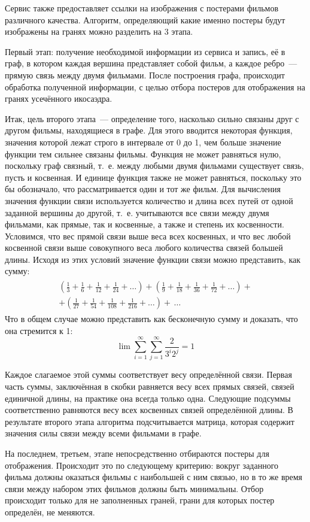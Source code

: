 \documentclass[oneside,final,14pt]{extreport}
\begin{document}
Сервис также предоставляет ссылки на изображения с постерами фильмов различного качества. Алгоритм, определяющий какие именно постеры будут изображены на гранях можно разделить на 3 этапа.

Первый этап: получение необходимой информации из сервиса и запись, её в граф, в котором каждая вершина представляет собой фильм, а каждое ребро~--- прямую связь между двумя фильмами. После построения графа, происходит обработка полученной информации, с целью отбора постеров для отображения на гранях усечённого икосаэдра.

Итак, цель второго этапа~--- определение того, насколько сильно связаны друг с другом фильмы, находящиеся в графе. Для этого вводится некоторая функция, значения которой лежат строго в интервале от 0 до 1, чем больше значение функции тем сильнее связаны фильмы. Функция не может равняться нулю, поскольку граф связный, т.~е. между любыми двумя фильмами существует связь, пусть и косвенная. И единице функция также не может равняться, поскольку это бы обозначало, что рассматривается один и тот же фильм. Для вычисления значения функции связи используется количество и длина всех путей от одной заданной вершины до другой, т.~е. учитываются все связи между двумя фильмами, как прямые, так и косвенные, а также и степень их косвенности. Условимся, что вес прямой связи выше веса всех косвенных, и что вес любой косвенной связи выше совокупного веса любого количества связей большей длины. Исходя из этих условий значение функции связи можно представить, как сумму:
\begin{align} \begin{split}
\left ( \frac{1}{3} + \frac{1}{6} + \frac{1}{12} + \frac{1}{24} + \ldots \right ) +
\left ( \frac{1}{9} + \frac{1}{18} + \frac{1}{36} + \frac{1}{72} + \ldots \right ) + \\ +
\left ( \frac{1}{27} + \frac{1}{54} + \frac{1}{108} + \frac{1}{216} + \ldots \right ) + \,\ldots
\end{split} \end{align}
Что в общем случае можно представить как бесконечную сумму и доказать, что она стремится к 1:
\begin{equation} \lim \sum_{i=1}^{\infty} \sum_{j=1}^{\infty} \frac{2}{ 3^{i} 2^{j} } = 1 \end{equation}

Каждое слагаемое этой суммы соответствует весу определённой связи. Первая часть суммы, заключённая в скобки равняется весу всех прямых связей, связей единичной длины, на практике она всегда только одна. Следующие подсуммы соответственно равняются весу всех косвенных связей определённой длины. В результате второго этапа алгоритма подсчитывается матрица, которая содержит значения силы связи между всеми фильмами в графе.

На последнем, третьем, этапе непосредственно отбираются постеры для отображения. Происходит это по следующему критерию: вокруг заданного фильма должны оказаться фильмы с наибольшей с ним связью, но в то же время связи между набором этих фильмов должны быть минимальны. Отбор происходит только для не заполненных граней, грани для которых постер определён, не меняются.
\end{document}
